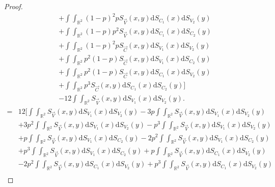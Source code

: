 \begin{proof}
\begin{align*}
        &+\int\int_{\mathbb{R}^2}\left(1-p\right)^2pS_{\vec{V}}\left(x,y\right)\mathrm{d}S_{C_1}\left(x\right)\mathrm{d}S_{V_2}\left(y\right)\\
        &+\int\int_{\mathbb{R}^2}\left(1-p\right)p^2S_{\vec{V}}\left(x,y\right)\mathrm{d}S_{C_1}\left(x\right)\mathrm{d}S_{C_2}\left(y\right)\\
        &+\int\int_{\mathbb{R}^2}\left(1-p\right)^2pS_{\vec{C}}\left(x,y\right)\mathrm{d}S_{V_1}\left(x\right)\mathrm{d}S_{V_2}\left(y\right)\\
        &+\int\int_{\mathbb{R}^2}p^2\left(1-p\right)S_{\vec{C}}\left(x,y\right)\mathrm{d}S_{V_1}\left(x\right)\mathrm{d}S_{C_2}\left(y\right)\\
        &+\int\int_{\mathbb{R}^2}p^2\left(1-p\right)S_{\vec{C}}\left(x,y\right)\mathrm{d}S_{C_1}\left(x\right)\mathrm{d}S_{V_2}\left(y\right)\\
        &+\int\int_{\mathbb{R}^2}p^3S_{\vec{C}}\left(x,y\right)\mathrm{d}S_{C_1}\left(x\right)\mathrm{d}S_{C_2}\left(y\right)\bigg]\\
        &-12\int\int_{\mathbb{R}^2}S_{\vec{V}}\left(x,y\right)\mathrm{d}S_{V_1}\left(x\right)\mathrm{d}S_{V_2}\left(y\right).
    \end{align*}
    \begin{align*}
        =&12\bigg[\int\int_{\mathbb{R}^2}S_{\vec{V}}\left(x,y\right)\mathrm{d}S_{V_1}\left(x\right)\mathrm{d}S_{V_2}\left(y\right)-3p\int\int_{\mathbb{R}^2}S_{\vec{V}}\left(x,y\right)\mathrm{d}S_{V_1}\left(x\right)\mathrm{d}S_{V_2}\left(y\right)\\
        &+3p^2\int\int_{\mathbb{R}^2}S_{\vec{V}}\left(x,y\right)\mathrm{d}S_{V_1}\left(x\right)\mathrm{d}S_{V_2}\left(y\right)-p^3\int\int_{\mathbb{R}^2}S_{\vec{V}}\left(x,y\right)\mathrm{d}S_{V_1}\left(x\right)\mathrm{d}S_{V_2}\left(y\right)\\
        &+p\int\int_{\mathbb{R}^2}S_{\vec{V}}\left(x,y\right)\mathrm{d}S_{V_1}\left(x\right)\mathrm{d}S_{C_2}\left(y\right)-2p^2\int\int_{\mathbb{R}^2}S_{\vec{V}}\left(x,y\right)\mathrm{d}S_{V_1}\left(x\right)\mathrm{d}S_{C_2}\left(y\right)\\
        &+p^3\int\int_{\mathbb{R}^2}S_{\vec{V}}\left(x,y\right)\mathrm{d}S_{V_1}\left(x\right)\mathrm{d}S_{C_2}\left(y\right)+p\int\int_{\mathbb{R}^2}S_{\vec{V}}\left(x,y\right)\mathrm{d}S_{C_1}\left(x\right)\mathrm{d}S_{V_2}\left(y\right)\\
        &-2p^2\int\int_{\mathbb{R}^2}S_{\vec{V}}\left(x,y\right)\mathrm{d}S_{C_1}\left(x\right)\mathrm{d}S_{V_2}\left(y\right)+p^3\int\int_{\mathbb{R}^2}S_{\vec{V}}\left(x,y\right)\mathrm{d}S_{C_1}\left(x\right)\mathrm{d}S_{V_2}\left(y\right)\\

\end{align*}
\end{proof}
